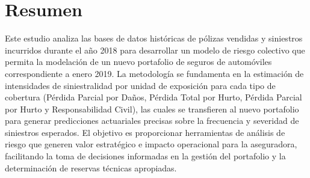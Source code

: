 \section{Resumen}

Este estudio analiza las bases de datos históricas de pólizas vendidas y siniestros incurridos durante el año 2018 para desarrollar un modelo de riesgo colectivo que permita la modelación de un nuevo portafolio de seguros de automóviles correspondiente a enero 2019. La metodología se fundamenta en la estimación de intensidades de siniestralidad por unidad de exposición para cada tipo de cobertura (Pérdida Parcial por Daños, Pérdida Total por Hurto, Pérdida Parcial por Hurto y Responsabilidad Civil), las cuales se transfieren al nuevo portafolio para generar predicciones actuariales precisas sobre la frecuencia y severidad de siniestros esperados. El objetivo es proporcionar herramientas de análisis de riesgo que generen valor estratégico e impacto operacional para la aseguradora, facilitando la toma de decisiones informadas en la gestión del portafolio y la determinación de reservas técnicas apropiadas.